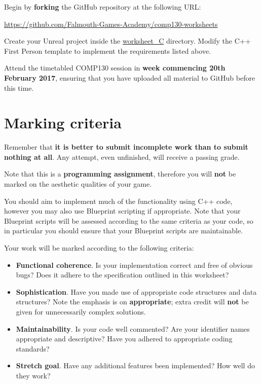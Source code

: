 \documentclass{../../fal_assignment}
\begin{document}
Begin by \textbf{forking} the GitHub repository at the following URL:

\url{https://github.com/Falmouth-Games-Academy/comp130-worksheets}

Create your Unreal project inside the \url{worksheet_C} directory.
Modify the C++ First Person template to implement the requirements listed above.

Attend the timetabled COMP130 session in \textbf{week commencing 20th February 2017},
ensuring that you have uploaded all material to GitHub before this time.

\section*{Marking criteria}

Remember that \textbf{it is better to submit incomplete work than to submit nothing at all}.
Any attempt, even unfinished, will receive a passing grade.

Note that this is a \textbf{programming assignment},
therefore you will \textbf{not} be marked on the aesthetic qualities of your game.

You should aim to implement much of the functionality using C++ code,
however you may also use Blueprint scripting if appropriate.
Note that your Blueprint scripts will be assessed according to the same criteria as your code,
so in particular you should ensure that your Blueprint scripts are maintainable.

Your work will be marked according to the following criteria:
\begin{itemize}
	\item \textbf{Functional coherence}. Is your implementation correct and free of obvious bugs?
		Does it adhere to the specification outlined in this worksheet?
	\item \textbf{Sophistication}. Have you made use of appropriate code structures and data structures?
		Note the emphasis is on \textbf{appropriate}; extra credit will \textbf{not} be given for unnecessarily complex solutions.
	\item \textbf{Maintainability}. Is your code well commented? Are your identifier names appropriate and descriptive?
		Have you adhered to appropriate coding standards?
	\item \textbf{Stretch goal}. Have any additional features been implemented? How well do they work?
\end{itemize}
\end{document}
